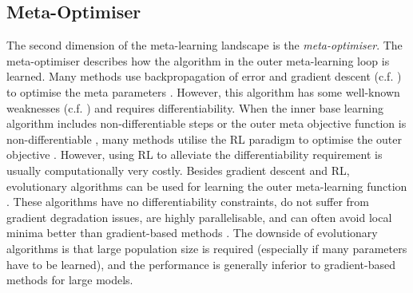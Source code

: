 \subsection{Meta-Optimiser}
The second dimension of the meta-learning landscape is the \emph{meta-optimiser}.
The meta-optimiser describes how the algorithm in the outer meta-learning loop is learned.
Many methods use backpropagation of error and gradient descent (c.f. ) to optimise the meta parameters \cite{ravi2017optimization, 10-5555-3305381-3305498, li2019feature, 10-5555-3305381-3305502, pmlr-v80-franceschi18a, Micaelli_Storkey_2021, pmlr-v108-lorraine20a}.
However, this algorithm has some well-known weaknesses (c.f. ) and requires differentiability.
When the inner base learning algorithm includes non-differentiable steps  or the outer meta objective function is non-differentiable , many methods utilise the RL paradigm to optimise the outer objective .
However, using RL to alleviate the differentiability requirement is usually computationally very costly.
Besides gradient descent and RL, evolutionary algorithms can be used for learning the outer meta-learning function \cite{schmidhuber-1987, Stanley_Clune_Lehman_Miikkulainen_2019, Salimans_Ho_Chen_Sidor_Sutskever_2017}.
These algorithms have no differentiability constraints, do not suffer from gradient degradation issues, are highly parallelisable, and can often avoid local minima better than gradient-based methods .
The downside of evolutionary algorithms is that large population size is required (especially if many parameters have to be learned), and the performance is generally inferior to gradient-based methods for large models.

